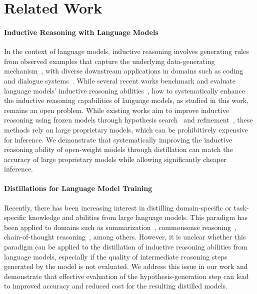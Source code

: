 \section{Related Work}
\label{sec:related}
\paragraph{Inductive Reasoning with Language Models} In the context of language models, inductive reasoning involves generating rules from observed examples that capture the underlying data-generating mechanism~\citep{wang2023hypothesis, qiu2023phenomenal, yang-etal-2024-language}, with diverse downstream applications in domains such as coding~\citep{shao-etal-2025-case2code} and dialogue systems~\citep{xie-etal-2024-shot-dialogue}. While several recent works benchmark and evaluate language models' inductive reasoning abilities~\citep{li2025mirageevaluatingexplaininginductive, gendron2024largelanguagemodelsstrong}, how to systematically enhance the inductive reasoning capabilities of language models, as studied in this work, remains an open problem. While existing works aim to improve inductive reasoning using frozen models through hypothesis search~\citep{wang2023hypothesis} and refinement~\citep{qiu2023phenomenal}, these methods rely on large proprietary models, which can be prohibitively expensive for inference. We demonstrate that systematically improving the inductive reasoning ability of open-weight models through distillation can match the accuracy of large proprietary models while allowing significantly cheaper inference.

\paragraph{Distillations for Language Model Training} 
Recently, there has been increasing interest in distilling domain-specific or task-specific knowledge and abilities from large language models. This paradigm has been applied to domains such as summarization~\citep{jung-etal-2024-impossible}, commonsense reasoning~\citep{west-etal-2022-symbolic}, chain-of-thought reasoning~\citep{li-etal-2024-mode}, among others. However, it is unclear whether this paradigm can be applied to the distillation of inductive reasoning abilities from language models, especially if the quality of intermediate reasoning steps generated by the model is not evaluated. We address this issue in our work and demonstrate that effective evaluation of the hypothesis-generation step can lead to improved accuracy and reduced cost for the resulting distilled models.

